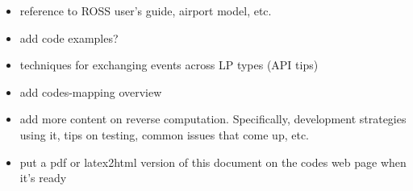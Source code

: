 \documentclass[conference,10pt,compsocconf,onecolumn]{IEEEtran}
\begin{document}
\begin{itemize}
    \item reference to ROSS user's guide, airport model, etc.
    \item add code examples?
    \item techniques for exchanging events across LP types (API tips)
    \item add codes-mapping overview
    \item add more content on reverse computation. Specifically, development
        strategies using it, tips on testing, common issues that come up, etc.
    \item put a pdf or latex2html version of this document on the codes web page
        when it's ready
\end{itemize}

\begin{comment} ==== SCRATCH MATERIAL ====
\begin{figure}
\begin{lstlisting}[caption=Example code snippet., label=snippet-example]
for (i=0; i<n; i++) {
    for (j=0; j<i; j++) {
        /* do something */
    }
}
\end{lstlisting}
\end{figure}

Figure ~\ref{fig:snippet-example} shows an example of how to show a code
snippet in latex.  We can use this format as needed throughout the document.
\end{comment}
\end{document}
